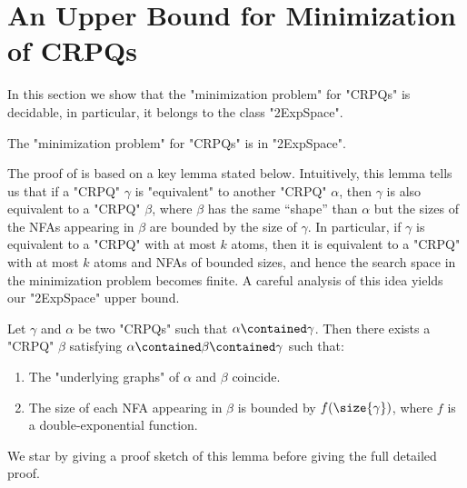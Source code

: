 \section{An Upper Bound for Minimization of CRPQs}
\AP\label{sec:upperCRPQ}
In this section we show that the "minimization problem" for "CRPQs" is decidable, in particular, it belongs to the class "2ExpSpace".

\begin{theorem}
	\AP\label{thm:2expspace-min-crpqs}
	The "minimization problem" for "CRPQs" is in "2ExpSpace".
\end{theorem}

The proof of  is based on a key lemma stated below. Intuitively, this lemma tells us that if a "CRPQ" $\gamma$ is "equivalent" to another "CRPQ" $\alpha$, then $\gamma$ is also equivalent to a "CRPQ" $\beta$, where $\beta$ has the same “shape” than $\alpha$ but the sizes of the NFAs appearing in $\beta$ are bounded by the size of $\gamma$. In particular, if $\gamma$  is equivalent to a  "CRPQ" with at most $k$ atoms, then it is equivalent to a "CRPQ" with at most $k$ atoms and NFAs of bounded sizes, and hence the search space in the minimization problem becomes finite. A careful analysis of this idea yields our "2ExpSpace" upper bound.

\begin{lemma}
	\AP\label{lemma:crpq-size-bound}
	Let $\gamma$ and $\alpha$ be two "CRPQs" such that $\alpha \contained \gamma$. Then there exists a "CRPQ" $\beta$ satisfying $\alpha \contained \beta\contained \gamma$ such that:
	\begin{enumerate}
		\item The "underlying graphs" of $\alpha$ and $\beta$ coincide.
		\item The size of each NFA appearing in $\beta$ is bounded by $f(\size{\gamma})$,
			where $f$ is a double-exponential function.
	\end{enumerate}
\end{lemma}

We star by giving a proof sketch of this lemma before giving the full
detailed proof.

